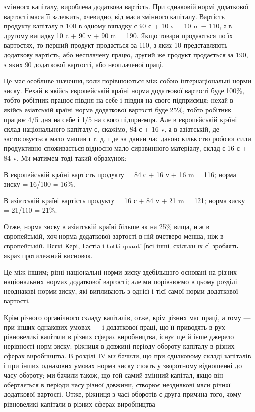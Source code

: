 змінного капіталу, вироблена додаткова вартість. При однаковій
нормі додаткової вартості маса її залежить, очевидно, від маси
змінного капіталу. Вартість продукту капіталу в 100 в одному
випадку є 90 с + 10 v + 10 m = 110, а в другому випадку 10 c + 90 v + 90 m = 190. Якщо товари
продаються по їх вартостях,
то перший продукт продається за 110, з яких 10 представляють додаткову вартість, або неоплачену
працю; другий же
продукт продається за 190, з яких 90 додаткової вартості, або
неоплаченої праці.

Це має особливе значення, коли порівнюються між собою
інтернаціональні норми зиску. Нехай в якійсь європейській країні
норма додаткової вартості буде 100\%, тобто робітник працює
півдня на себе і півдня на свого підприємця; нехай в якійсь
азіатській країні норма додаткової вартості буде 25\%, тобто робітник працює 4/5 дня на себе і 1/5 на
свого підприємця. Але
в європейській країні склад національного капіталу є, скажімо,
84 с + 16 v, а в азіатській, де застосовується мало машин і т. д.
і де за даний час даною кількістю робочої сили продуктивно
споживається відносно мало сировинного матеріалу, склад є
16 с + 84 v. Ми матимем тоді такий обрахунок:

В європейській країні вартість продукту = 84 с + 16 v + 16 m = 116; норма зиску = 16/100 = 16\%.

В азіатській країні вартість продукту = 16 с + 84 v + 21 m = 121; норма зиску = 21/100 = 21\%.

Отже, норма зиску в азіатській країні більше як на 25\% вища, ніж в європейській, хоч норма
додаткової вартості в ній
вчетверо менша, ніж в європейській. Всякі Кері, Бастіа і tutti quanti [всі інші, скільки їх є]
зроблять якраз протилежний висновок.

Це між іншим; різні національні норми зиску здебільшого
основані на різних національних нормах додаткової вартості;
але ми порівнюємо в цьому розділі неоднакові норми зиску,
які випливають з однієї і тієї самої норми додаткової вартості.

Крім різного органічного складу капіталів, отже, крім різних
мас праці, а тому — при інших однакових умовах — і додаткової
праці, що її приводять в рух рівновеликі капітали в різних сферах
виробництва, існує ще й інше джерело нерівності норм зиску:
ріжниця в довжині періоду обороту капіталу в різних сферах
виробництва. В розділі IV ми бачили, що при однаковому складі
капіталів і при інших однакових умовах норми зиску стоять у зворотному відношенні до часу обороту;
ми бачили також, що
той самий змінний капітал, якщо він обертається в періоди
часу різної довжини, створює неоднакові маси річної додаткової вартості. Отже, ріжниця в часі
оборотів є друга причина
того, чому рівновеликі капітали в різних сферах виробництва
